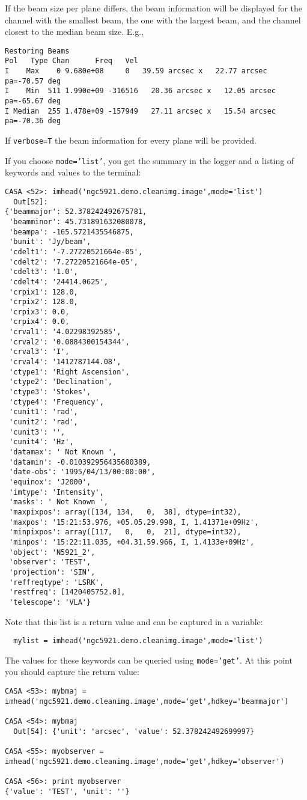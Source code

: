 If the beam size per plane differs, the beam information will be
displayed for the channel with the smallest beam, the one with the
largest beam, and the channel closest to the median beam size. E.g.,

\small
\begin{verbatim}
Restoring Beams
Pol   Type Chan      Freq   Vel
I    Max    0 9.680e+08     0   39.59 arcsec x   22.77 arcsec pa=-70.57 deg
I    Min  511 1.990e+09 -316516   20.36 arcsec x   12.05 arcsec pa=-65.67 deg
I Median  255 1.478e+09 -157949   27.11 arcsec x   15.54 arcsec pa=-70.36 deg 
\end{verbatim}
\normalsize

If {\tt verbose=T} the beam information for every plane will be provided.

If you choose {\tt mode='list'}, you get the summary in the logger and
a listing of keywords and values to the terminal:
\small
\begin{verbatim}
CASA <52>: imhead('ngc5921.demo.cleanimg.image',mode='list')
  Out[52]: 
{'beammajor': 52.378242492675781,
 'beamminor': 45.731891632080078,
 'beampa': -165.5721435546875,
 'bunit': 'Jy/beam',
 'cdelt1': '-7.27220521664e-05',
 'cdelt2': '7.27220521664e-05',
 'cdelt3': '1.0',
 'cdelt4': '24414.0625',
 'crpix1': 128.0,
 'crpix2': 128.0,
 'crpix3': 0.0,
 'crpix4': 0.0,
 'crval1': '4.02298392585',
 'crval2': '0.0884300154344',
 'crval3': 'I',
 'crval4': '1412787144.08',
 'ctype1': 'Right Ascension',
 'ctype2': 'Declination',
 'ctype3': 'Stokes',
 'ctype4': 'Frequency',
 'cunit1': 'rad',
 'cunit2': 'rad',
 'cunit3': '',
 'cunit4': 'Hz',
 'datamax': ' Not Known ',
 'datamin': -0.010392956435680389,
 'date-obs': '1995/04/13/00:00:00',
 'equinox': 'J2000',
 'imtype': 'Intensity',
 'masks': ' Not Known ',
 'maxpixpos': array([134, 134,   0,  38], dtype=int32),
 'maxpos': '15:21:53.976, +05.05.29.998, I, 1.41371e+09Hz',
 'minpixpos': array([117,   0,   0,  21], dtype=int32),
 'minpos': '15:22:11.035, +04.31.59.966, I, 1.4133e+09Hz',
 'object': 'N5921_2',
 'observer': 'TEST',
 'projection': 'SIN',
 'reffreqtype': 'LSRK',
 'restfreq': [1420405752.0],
 'telescope': 'VLA'}
\end{verbatim}
\normalsize
Note that this list is a return value and can be captured in a
variable:
\small
\begin{verbatim}
  mylist = imhead('ngc5921.demo.cleanimg.image',mode='list')
\end{verbatim}
\normalsize

The values for these keywords can be queried using {\tt mode='get'}.
At this point you should capture the return value:
\small
\begin{verbatim}
CASA <53>: mybmaj = imhead('ngc5921.demo.cleanimg.image',mode='get',hdkey='beammajor')

CASA <54>: mybmaj
  Out[54]: {'unit': 'arcsec', 'value': 52.378242492699997}

CASA <55>: myobserver = imhead('ngc5921.demo.cleanimg.image',mode='get',hdkey='observer')

CASA <56>: print myobserver
{'value': 'TEST', 'unit': ''}
\end{verbatim}
\normalsize

